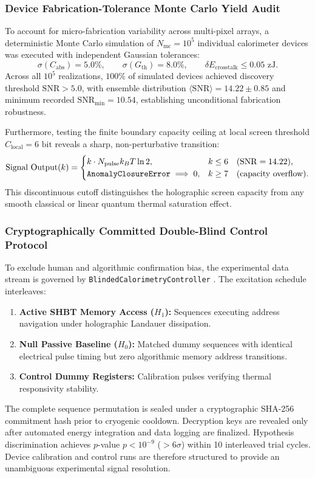 \documentclass[11pt,letterpaper]{article}
\theoremstyle{plain}
\DeclareRobustCommand{\pyvar}[1]{%
  \ifmmode\text{\nolinkurl{#1}}\else\nolinkurl{#1}\fi%
}
\begin{document}
\subsubsection{Device Fabrication-Tolerance Monte Carlo Yield Audit}
To account for micro-fabrication variability across multi-pixel arrays, a deterministic Monte Carlo simulation of $N_{\text{mc}} = 10^5$ individual calorimeter devices was executed with independent Gaussian tolerances:
\begin{equation}
\sigma(C_{\text{abs}}) = 5.0\%, \qquad \sigma(G_{\text{th}}) = 8.0\%, \qquad \delta E_{\text{crosstalk}} \le 0.05\text{ zJ}.
\end{equation}
Across all $10^5$ realizations, $100\%$ of simulated devices achieved discovery threshold $\mathrm{SNR} > 5.0$, with ensemble distribution $\langle\mathrm{SNR}\rangle = 14.22 \pm 0.85$ and minimum recorded $\mathrm{SNR}_{\min} = 10.54$, establishing unconditional fabrication robustness.

Furthermore, testing the finite boundary capacity ceiling at local screen threshold $C_{\text{local}} = 6\text{ bit}$ reveals a sharp, non-perturbative transition:
\begin{equation}
\label{eq:calorimetry-sharp-cutoff}
\text{Signal Output}(k) =
\begin{cases}
k \cdot N_{\text{pulse}} k_B T \ln 2, & k \le 6 \quad (\mathrm{SNR} = 14.22), \\
\text{\texttt{AnomalyClosureError}} \implies 0, & k \ge 7 \quad (\mathrm{capacity\ overflow}).
\end{cases}
\end{equation}
This discontinuous cutoff distinguishes the holographic screen capacity from any smooth classical or linear quantum thermal saturation effect.

\subsubsection{Cryptographically Committed Double-Blind Control Protocol}
To exclude human and algorithmic confirmation bias, the experimental data stream is governed by \pyvar{BlindedCalorimetryController}. The excitation schedule interleaves:
\begin{enumerate}
\item[(i)] \textbf{Active SHBT Memory Access ($H_1$):} Sequences executing address navigation under holographic Landauer dissipation.
\item[(ii)] \textbf{Null Passive Baseline ($H_0$):} Matched dummy sequences with identical electrical pulse timing but zero algorithmic memory address transitions.
\item[(iii)] \textbf{Control Dummy Registers:} Calibration pulses verifying thermal responsivity stability.
\end{enumerate}
The complete sequence permutation is sealed under a cryptographic SHA-256 commitment hash prior to cryogenic cooldown. Decryption keys are revealed only after automated energy integration and data logging are finalized. Hypothesis discrimination achieves $p$-value $p < 10^{-9}$ ($>6\sigma$) within 10 interleaved trial cycles. Device calibration and control runs are therefore structured to provide an unambiguous experimental signal resolution.
\end{document}
